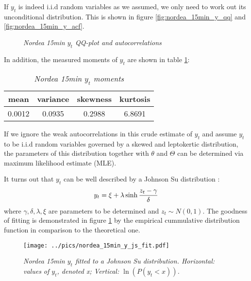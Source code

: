 If $y_t$ is indeed i.i.d random variables as we assumed, we only need
to work out its unconditional distribution. This is shown in figure
\ref{fig:nordea_15min_y_qq} and \ref{fig:nordea_15min_y_acf}.
\begin{figure}[htb!]
  \centering
  \caption{\small \it Nordea 15min $y_t$ QQ-plot and autocorrelations}
\end{figure}
In addition, the measured moments of $y_t$ are shown in table
\ref{tab:nordea_15min_y_moments}:
\begin{table}[htb!]
  \centering
  \begin{tabular}{|c|c|c|c|}
    \hline
    mean & variance & skewness & kurtosis \\
    \hline
    0.0012 & 0.0935 & 0.2988 & 6.8691 \\
    \hline
  \end{tabular}
  \caption{\small \it Nordea 15min $y_t$ moments}
  \label{tab:nordea_15min_y_moments}
\end{table}

If we ignore the weak autocorrelations in this crude estimate of
$y_t$ and assume $y_t$ to be i.i.d random variables governed
by a skewed and leptokertic distribution, the parameters of this
distribution together with $\theta$ and $\Theta$ can be determined via
maximum likelihood estimate (MLE).

It turns out that $y_t$ can be well described by a Johnson Su
distribution \cite{Shang2004}:
\[
  y_t = \xi + \lambda\sinh{z_t - \gamma \over \delta}
\]
where $\gamma, \delta, \lambda, \xi$ are parameters to be determined
and $z_t \sim N(0, 1)$. The goodness of fitting is demonstrated in
figure \ref{fig:nordea_15min_y_js_fit} by the
empirical cummulative distribution function in comparison to the
theoretical one.
\begin{figure}[htb!]
  \centering
    \texttt{[image: ../pics/nordea\_15min\_y\_js\_fit.pdf]}
    \caption{\small \it Nordea 15min $y_t$ fitted to a Johnson Su
      distribution. Horizontal: values of $y_t$, denoted x; Vertical:
      $\ln\left(P(y_t < x)\right)$.}
    \label{fig:nordea_15min_y_js_fit}
\end{figure}

